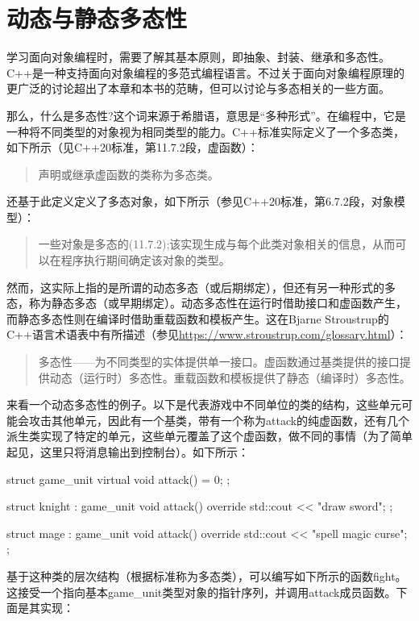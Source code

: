 \section{动态与静态多态性}
学习面向对象编程时，需要了解其基本原则，即抽象、封装、继承和多态性。C++是一种支持面向对象编程的多范式编程语言。不过关于面向对象编程原理的更广泛的讨论超出了本章和本书的范畴，但可以讨论与多态相关的一些方面。

那么，什么是多态性?这个词来源于希腊语，意思是“多种形式”。在编程中，它是一种将不同类型的对象视为相同类型的能力。C++标准实际定义了一个多态类，如下所示（见C++20标准，第11.7.2段，虚函数）：

\begin{quote}
声明或继承虚函数的类称为多态类。
\end{quote}

还基于此定义定义了多态对象，如下所示（参见C++20标准，第6.7.2段，对象模型）：

\begin{quote}
一些对象是多态的(11.7.2);该实现生成与每个此类对象相关的信息，从而可以在程序执行期间确定该对象的类型。
\end{quote}

然而，这实际上指的是所谓的动态多态（或后期绑定），但还有另一种形式的多态，称为静态多态（或早期绑定）。动态多态性在运行时借助接口和虚函数产生，而静态多态性则在编译时借助重载函数和模板产生。这在Bjarne Stroustrup的C++语言术语表中有所描述（参见\url{https://www.stroustrup.com/glossary.html}）：

\begin{quote}
多态性——为不同类型的实体提供单一接口。虚函数通过基类提供的接口提供动态（运行时）多态性。重载函数和模板提供了静态（编译时）多态性。
\end{quote}

来看一个动态多态性的例子。以下是代表游戏中不同单位的类的结构，这些单元可能会攻击其他单元，因此有一个基类，带有一个称为attack的纯虚函数，还有几个派生类实现了特定的单元，这些单元覆盖了这个虚函数，做不同的事情（为了简单起见，这里只将消息输出到控制台）。如下所示：

\begin{cpp}
struct game_unit
{
	virtual void attack() = 0;
};

struct knight : game_unit
{
	void attack() override
	{ std::cout << "draw sword\n"; }
};

struct mage : game_unit
{
	void attack() override
	{ std::cout << "spell magic curse\n"; }
};
\end{cpp}

基于这种类的层次结构（根据标准称为多态类），可以编写如下所示的函数fight。这接受一个指向基本game\_unit类型对象的指针序列，并调用attack成员函数。下面是其实现：

